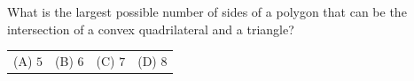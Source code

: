 What is the largest possible number of sides of a polygon that can be the intersection of a convex quadrilateral and a triangle?



\begin{tabular}{llll}
(A) $5$ & (B) $6$ & (C) $7$ & (D) $8$
\end{tabular}
